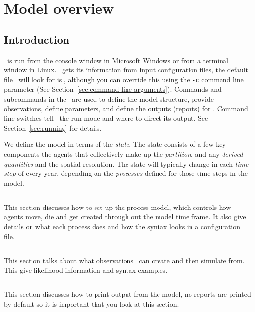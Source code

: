 \section{Model overview\label{sec:overview}}

\subsection{Introduction}

\IBM\ is run from the console window in Microsoft Windows or from a terminal window in Linux. \IBM\ gets its information from input configuration files, the default file \IBM\ will look for is \emph{\config}, although you can override this using the \texttt{-c} command line parameter (See Section~\ref{sec:command-line-arguments}). Commands and subcommands in the \config\ are used to define the model structure, provide observations, define parameters, and define the outputs (reports) for \IBM. Command line switches tell \IBM\ the run mode and where to direct its output. See Section~\ref{sec:running} for details.

We define the model in terms of the \emph{state}. The state consists of a few key components the agents that collectively make up the \emph{partition}, and any \emph{derived quantities} and the spatial resolution. The state will typically change in each \emph{time-step} of every year, depending on the \emph{processes} defined for those time-steps in the model. 

\subsection{}
This section discusses how to set up the process model, which controls how agents move, die and get created through out the model time frame. It also give details on what each process does and how the syntax looks in a configuration file.

\subsection{}
This section talks about what observations \IBM\ can create and then simulate from. This give likelihood information and syntax examples.

\subsection{}
This section discusses how to print output from the model, no reports are printed by default so it is important that you look at this section.